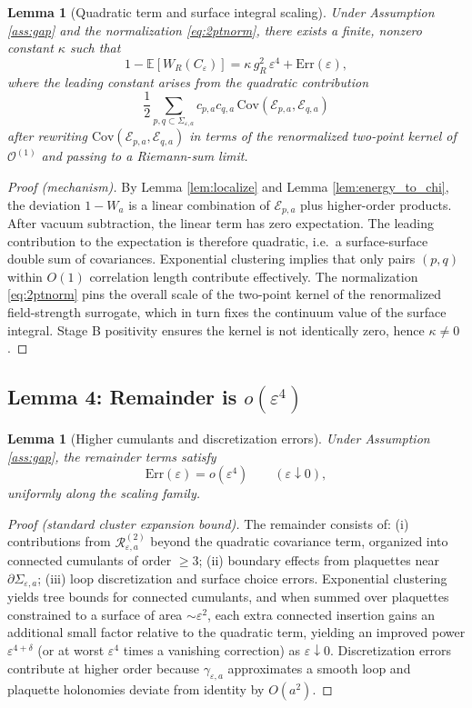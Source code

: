 \documentclass[11pt]{article}
\newtheorem{lemma}[theorem]{Lemma}
\theoremstyle{definition}
\newcommand{\E}{\mathbb{E}}
\newcommand{\Cov}{\mathrm{Cov}}
\newcommand{\1}{\mathbf{1}}
\begin{document}
\begin{lemma}[Quadratic term and surface integral scaling]\label{lem:quad}
Under Assumption \ref{ass:gap} and the normalization \eqref{eq:2ptnorm}, there exists a finite, nonzero constant $\kappa$
such that
\[
1-\E[W_R(C_\varepsilon)]
=
\kappa\,g_R^2\,\varepsilon^4 + \mathrm{Err}(\varepsilon),
\]
where the leading constant arises from the quadratic contribution
\[
\frac12\sum_{p,q\subset\Sigma_{\varepsilon,a}} c_{p,a}c_{q,a}\,\Cov(\mathcal E_{p,a},\mathcal E_{q,a})
\]
after rewriting $\Cov(\mathcal E_{p,a},\mathcal E_{q,a})$ in terms of the renormalized two-point kernel of
$\mathcal O^{(1)}$ and passing to a Riemann-sum limit.
\end{lemma}

\begin{proof}[Proof (mechanism)]
By Lemma \ref{lem:localize} and Lemma \ref{lem:energy_to_chi}, the deviation $1-W_a$ is a linear combination of $\mathcal E_{p,a}$
plus higher-order products. After vacuum subtraction, the linear term has zero expectation. The leading contribution to the
expectation is therefore quadratic, i.e.\ a surface-surface double sum of covariances. Exponential clustering implies that only
pairs $(p,q)$ within $O(1)$ correlation length contribute effectively. The normalization \eqref{eq:2ptnorm} pins the overall scale
of the two-point kernel of the renormalized field-strength surrogate, which in turn fixes the continuum value of the surface
integral. Stage B positivity ensures the kernel is not identically zero, hence $\kappa\neq 0$.
\end{proof}

\subsection{Lemma 4: Remainder is $o(\varepsilon^4)$}
\begin{lemma}[Higher cumulants and discretization errors]\label{lem:remainder}
Under Assumption \ref{ass:gap}, the remainder terms satisfy
\[
\mathrm{Err}(\varepsilon)=o(\varepsilon^4)\qquad(\varepsilon\downarrow 0),
\]
uniformly along the scaling family.
\end{lemma}

\begin{proof}[Proof (standard cluster expansion bound)]
The remainder consists of: (i) contributions from $\mathcal R^{(2)}_{\varepsilon,a}$ beyond the quadratic covariance term,
organized into connected cumulants of order $\ge 3$; (ii) boundary effects from plaquettes near $\partial\Sigma_{\varepsilon,a}$;
(iii) loop discretization and surface choice errors. Exponential clustering yields tree bounds for connected cumulants, and when
summed over plaquettes constrained to a surface of area $\sim\varepsilon^2$, each extra connected insertion gains an additional
small factor relative to the quadratic term, yielding an improved power $\varepsilon^{4+\delta}$ (or at worst $\varepsilon^4$ times
a vanishing correction) as $\varepsilon\downarrow 0$. Discretization errors contribute at higher order because $\gamma_{\varepsilon,a}$
approximates a smooth loop and plaquette holonomies deviate from identity by $O(a^2)$.
\end{proof}
\end{document}
